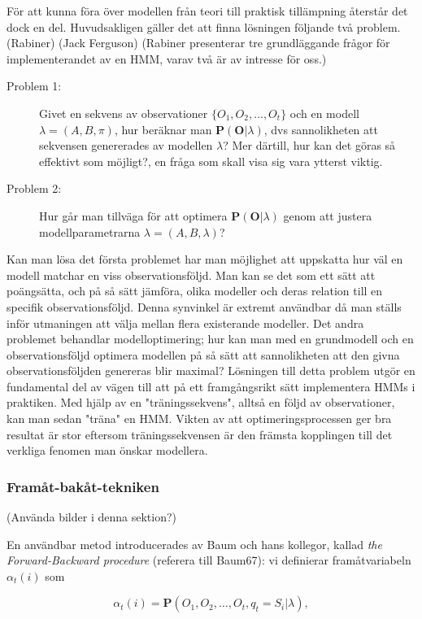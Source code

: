\documentclass[../rapport_MVEX01-11-05]{subfiles}
\begin{document}
För att kunna föra över modellen från teori till praktisk tillämpning
återstår det dock en del. Huvudsakligen gäller det att finna lösningen
följande två problem. (Rabiner) (Jack Ferguson) (Rabiner presenterar
tre grundläggande frågor för implementerandet av en HMM, varav två är
av intresse för oss.)
\begin{description}
\item[Problem 1:] Givet en sekvens av observationer
  $\{O_1,O_2,\dots,O_t\}$ och en modell $\lambda = (A,B,\pi)$, hur
  beräknar man $\textbf{P}(\textbf{O}|\lambda)$, dvs sannolikheten att
  sekvensen genererades av modellen $\lambda$? Mer därtill, hur kan
  det göras så effektivt som möjligt?, en fråga som skall visa sig
  vara ytterst viktig.  
\item[Problem 2:] Hur går man tillväga för att optimera
  $\textbf{P}(\textbf{O}|\lambda)$ genom att justera
  modellparametrarna $\lambda = (A,B,\lambda)$? 
\end{description}

Kan man lösa det första problemet har man möjlighet att uppskatta hur
väl en modell matchar en viss observationsföljd. Man kan se det som
ett sätt att poängsätta, och på så sätt jämföra, olika modeller och
deras relation till en specifik observationsföljd. Denna synvinkel är
extremt användbar då man ställs inför utmaningen att välja mellan
flera existerande modeller. 
Det andra problemet behandlar modelloptimering; hur kan man med en
grundmodell och en observationsföljd optimera modellen på så sätt att
sannolikheten att den givna observationsföljden genereras blir
maximal? Lösningen till detta problem utgör en fundamental del av
vägen till att på ett framgångsrikt sätt implementera HMMs i
praktiken. Med hjälp av en "träningssekvens", alltså en följd av
observationer, kan man sedan "träna" en HMM. Vikten av att
optimeringsprocessen ger bra resultat är stor eftersom
träningssekvensen är den främsta kopplingen till det verkliga fenomen
man önskar modellera.      

\subsubsection{Framåt-bakåt-tekniken}

(Använda bilder i denna sektion?)

En användbar metod introducerades av Baum och hans kollegor, kallad
\emph{the Forward-Backward procedure} (referera till Baum67): vi
definierar framåtvariabeln $\alpha_t(i)$ som 

\begin{equation*}
\alpha_t(i) = \textbf{P}(O_1,O_2,\dots,O_t,q_t = S_i | \lambda),
\end{equation*}
\end{document}
